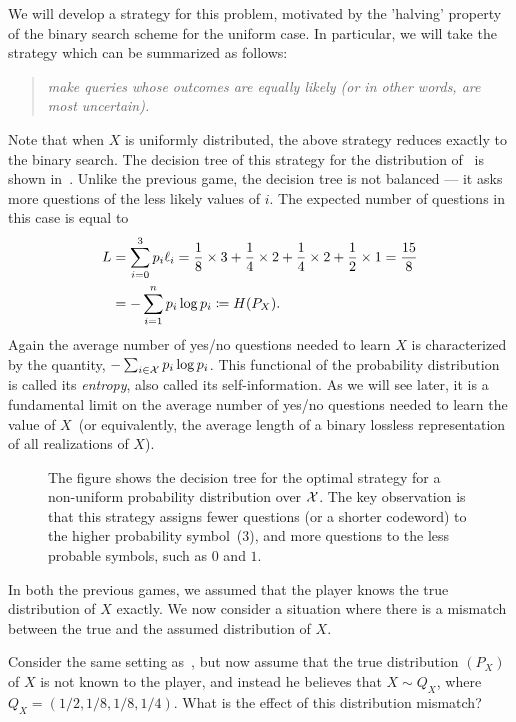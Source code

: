         We will develop a strategy for this problem, motivated by the 'halving' property of the binary search scheme for the uniform case. In particular, we will take the strategy which can be summarized as follows: 
        \begin{quote}
            \centering
                \emph{make queries whose outcomes are equally likely (or in other words, are most uncertain).}
        \end{quote}
        Note that when $X$ is uniformly distributed, the above strategy reduces exactly to the binary search. 
        The decision tree of this strategy for the distribution of~ is shown in~. Unlike the previous game, the decision tree is not balanced --- it asks more questions of the less likely values of $i$. The expected number of questions in this case is equal to 
        \begin{align}
            L &= \sum_{i=0}^3 p_i \ell_i = \frac{1}{8}\times 3 + \frac{1}{4} \times 2  + \frac{1}{4} \times 2 + \frac{1}{2} \times 1 = \frac{15}{8} \\
            & = -\sum_{i=1}^n p_i \log p_i \coloneqq H(P_X). 
        \end{align}
        Again the average number of yes/no questions needed to learn $X$ is characterized by the quantity, $-\sum_{i \in \mathcal{X}} p_i \log p_i$. This functional of the probability distribution is called its \emph{entropy}, also called its self-information. As we will see later, it is a fundamental limit  on the average number of yes/no questions needed to learn the value of $X$~(or equivalently, the average length of a binary lossless representation of all realizations of $X$).   

        \begin{figure}[hbt!]
            \centering
            \def\figwidth{0.5\columnwidth}
            \def\figheight{0.25\columnwidth} %
            
            \label{fig:guessing-game-II}
            \caption{The figure shows the decision tree for the optimal strategy for a non-uniform probability distribution over $\mathcal{X}$. The key observation is that this strategy assigns fewer questions (or a shorter codeword) to the higher probability symbol~($3$), and more questions to the less probable symbols, such as $0$ and $1$.}
        \end{figure}

        In both the previous games, we assumed that the player knows the true distribution of $X$ exactly. We now consider a situation where there is a mismatch between the true and the assumed distribution of $X$. 
        \begin{question}
            \label{question:guessing-game-III}
            Consider the same setting as~, but now assume that the true distribution $(P_X)$ of $X$ is not known to the player, and instead he believes that $X \sim Q_X$, where $Q_X = (1/2, 1/8, 1/8, 1/4)$. What is the effect of this distribution mismatch? 
        \end{question}

